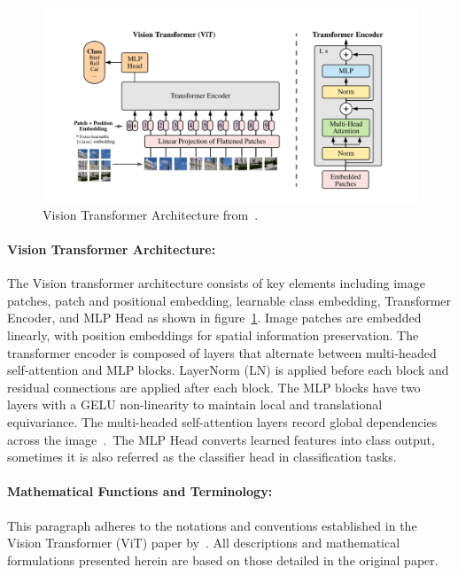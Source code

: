 \begin{figure}[h]
\begin{center}
\includegraphics[width=\textwidth]{Vit_arch.png}
\end{center}
\caption[Vision Transformer Architecture]{Vision Transformer Architecture from~\citep{Vit_Paper_Dosovitskiy2020AnII}.}
\label{fig:vit_arch}
\end{figure}

\paragraph{Vision Transformer Architecture:}
The Vision transformer architecture consists of key elements including image patches, patch and positional embedding, learnable class embedding, Transformer Encoder, and MLP Head as shown in figure~\ref{fig:vit_arch}. Image patches are embedded linearly, with position embeddings for spatial information preservation. The transformer encoder is composed of layers that alternate between multi-headed self-attention and MLP blocks. LayerNorm (LN) is applied before each block and residual connections are applied after each block. The MLP blocks have two layers with a GELU non-linearity to maintain local and translational equivariance. The multi-headed self-attention layers record global dependencies across the image~\citep{Vit_Paper_Dosovitskiy2020AnII}.~The MLP Head converts learned features into class output, sometimes it is also referred as the classifier head in classification tasks.

\paragraph{Mathematical Functions and Terminology:}
This paragraph adheres to the notations and conventions established in the Vision Transformer (ViT) paper by~\citet{Vit_Paper_Dosovitskiy2020AnII}. All descriptions and mathematical formulations presented herein are based on those detailed in the original paper.

